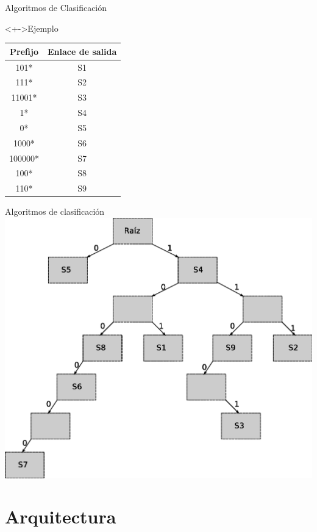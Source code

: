 \documentclass[xcolor=dvipsnames]{beamer}
\begin{document}
\begin{frame}{Algoritmos de Clasificación}
  \begin{block}<+->{Ejemplo}   
	\begin{center}
	\begin{tabular}{|c|c|} \hline
		\textbf{Prefijo} & \textbf{Enlace de salida} \\ \hline
		101* & S1 \\
		111* & S2 \\
		11001* & S3 \\
		1* & S4 \\
		0* & S5 \\
		1000* & S6 \\
		100000* & S7 \\
		100* & S8 \\
		110* & S9 \\	\hline
	\end{tabular}	
\end{center}

  \end{block}
\end{frame}

\begin{frame}{Algoritmos de clasificación}
\center 
\includegraphics[scale=0.40]{figures/trie.eps}
\end{frame}



\section{Arquitectura}
\end{document}
